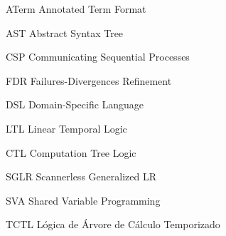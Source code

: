 \begin{siglas}
  \item[ATerm] Annotated Term Format
  \item[AST] Abstract Syntax Tree
  \item[CSP] Communicating Sequential Processes	
  \item[FDR] Failures-Divergences Refinement
  \item[DSL] Domain-Specific Language
  \item[LTL] Linear Temporal Logic
  \item[CTL] Computation Tree Logic
  \item[SGLR] Scannerless Generalized LR
  \item[SVA] Shared Variable Programming
  \item[TCTL] Lógica de Árvore de Cálculo Temporizado
\end{siglas}